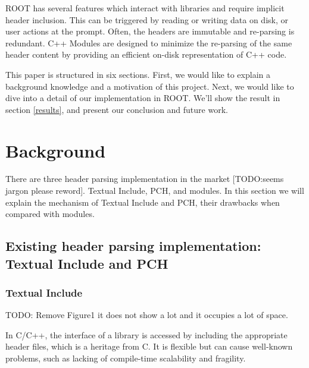 \documentclass{webofc}
\begin{document}
ROOT has several features which interact with libraries and require implicit header inclusion. This can be triggered by reading or writing data on disk, or user actions at the prompt. Often, the headers are immutable and re-parsing is redundant. C++ Modules are designed to minimize the re-parsing of the same header content by providing an efficient on-disk representation of C++ code.

This paper is structured in six sections. First, we would like to explain a background knowledge and a motivation of this project. Next, we would like to dive into a detail of our implementation in ROOT. We'll show the result in section \ref{results}, and present our conclusion and future work.

\section{Background}
\label{background}

There are three header parsing implementation in the market [TODO:seems jargon please reword]. Textual Include, PCH, and modules. In this section we will explain the mechanism of Textual Include and PCH, their drawbacks when compared with modules.

\subsection{Existing header parsing implementation: Textual Include and PCH}
\label{tandpch}

\subsubsection{Textual Include}

TODO: Remove Figure1 it does not show a lot and it occupies a lot of space.

In C/C++, the interface of a library is accessed by including the appropriate header files, which is a heritage from C. It is flexible but can cause well-known problems, such as lacking of compile-time scalability and fragility.
\end{document}

